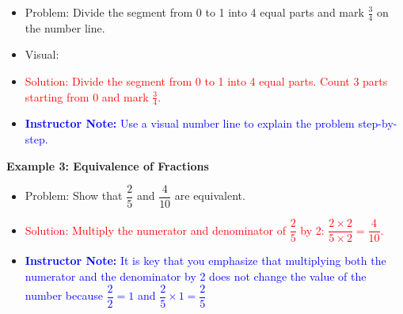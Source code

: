 \documentclass[12pt]{article}
\begin{document}
\begin{tcolorbox}[colframe=black!60, colback=white, 
coltitle=black, colbacktitle=black!15, fonttitle=\bfseries\Large, 
title=Examples with Solutions, halign title=center, left=10pt, right=10pt, top=10pt, bottom=15pt]
\begin{itemize}
    \item Problem: Divide the segment from 0 to 1 into 4 equal parts and mark \( \frac{3}{4} \) on the number line.
    \item Visual:
    \begin{center}
    \end{center}
    \item \textcolor{red}{Solution: Divide the segment from 0 to 1 into 4 equal parts. Count 3 parts starting from 0 and mark \( \frac{3}{4} \).}

    \item \textcolor{blue}{\textbf{Instructor Note:} Use a visual number line to explain the problem step-by-step.}
\end{itemize}



\textbf{Example 3: Equivalence of Fractions}
\begin{itemize}
    \item Problem: Show that \( \dfrac{2}{5} \) and \( \dfrac{4}{10} \) are equivalent.
    \item \textcolor{red}{Solution: Multiply the numerator and denominator of \( \dfrac{2}{5} \) by 2: \( \dfrac{2\times 2}{5 \times 2} = \dfrac{4}{10} \).}
    \item \textcolor{blue}{\textbf{Instructor Note:} It is key that you emphasize that multiplying both the numerator and the denominator by 2 does not change the value of the number because $\dfrac{2}{2} = 1$ and $\dfrac{2}{5} \times 1 = \dfrac{2}{5} $}
  
\end{itemize}








\end{tcolorbox}

\vspace{1em}
\end{document}
